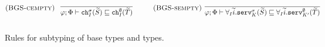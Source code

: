 \begin{table*}[h!]
\begin{framed}
\begin{align*}
        &\kern0em\runa{BGS-cempty}\;\infrule{}{\varphi;\Phi\vdash \texttt{ch}^\sigma_I(\widetilde{S}) \sqsubseteq \texttt{ch}^\emptyset_I(\widetilde{T})}\quad\runa{BGS-sempty}\;\infrule{}{\varphi;\Phi\vdash \forall_I\widetilde{i}.\texttt{serv}^\sigma_K(\widetilde{S}) \sqsubseteq \forall_I\widetilde{i}.\texttt{serv}^\emptyset_{K'}(\widetilde{T})}
    \end{align*}\vspace{-1em}\end{framed}
    \smallskip
    \caption{Rules for subtyping of base types and types.}
    \label{tab:subtypeSized}
\end{table*}